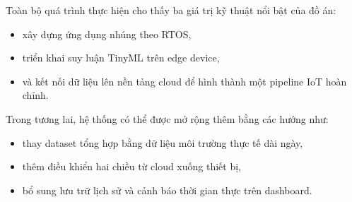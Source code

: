 \documentclass[12pt,a4paper]{article}
\begin{document}
Toàn bộ quá trình thực hiện cho thấy ba giá trị kỹ thuật nổi bật của đồ án:
\begin{itemize}
  \item xây dựng ứng dụng nhúng theo RTOS,
  \item triển khai suy luận TinyML trên edge device,
  \item và kết nối dữ liệu lên nền tảng cloud để hình thành một pipeline IoT hoàn chỉnh.
\end{itemize}

Trong tương lai, hệ thống có thể được mở rộng thêm bằng các hướng như:
\begin{itemize}
  \item thay dataset tổng hợp bằng dữ liệu môi trường thực tế dài ngày,
  \item thêm điều khiển hai chiều từ cloud xuống thiết bị,
  \item bổ sung lưu trữ lịch sử và cảnh báo thời gian thực trên dashboard.
\end{itemize}
\end{document}
